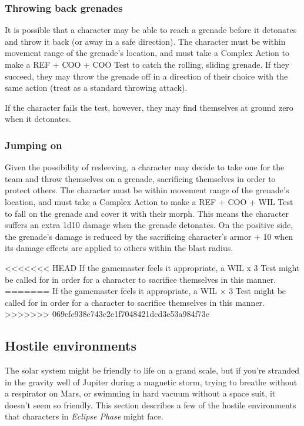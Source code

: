 \subsubsection{Throwing back grenades} 

It is possible that a character may be able to reach a grenade before it detonates and throw it back (or away in a safe direction). The character must be within movement range of the grenade’s location, and must take a Complex Action to make a REF + COO + COO Test to catch the rolling, sliding grenade. If they succeed, they may throw the grenade off in a direction of their choice with the same action (treat as a standard throwing attack). 

If the character fails the test, however, they may find themselves at ground zero when it detonates. 

\subsubsection{Jumping on} 

Given the possibility of resleeving, a character may decide to take one for the team and throw themselves on a grenade, sacrificing themselves in order to protect others. The character must be within movement range of the grenade’s location, and must take a Complex Action to make a REF + COO + WIL Test to fall on the grenade and cover it with their morph. This means the character suffers an extra 1d10 damage when the grenade detonates. On the positive side, the grenade’s damage is reduced by the sacrificing character’s armor + 10 when its damage effects are applied to others within the blast radius. 

<<<<<<< HEAD If the gamemaster feels it appropriate, a WIL x 3 Test might be called for in order for a character to sacrifice themselves in this manner. ======= If the gamemaster feels it appropriate, a WIL $\times$ 3 Test might be called for in order for a character to sacrifice themselves in this manner. >>>>>>> 069efc938e743c2e1f7048421dcd3e53a984f73e 

\subsection{Hostile environments} \label{sec:hostile-environments} The solar system might be friendly to life on a grand scale, but if you’re stranded in the gravity well of Jupiter during a magnetic storm, trying to breathe without a respirator on Mars, or swimming in hard vacuum without a space suit, it doesn’t seem so friendly. This section describes a few of the hostile environments that characters in \emph{Eclipse Phase} might face. 

